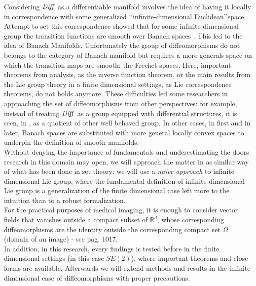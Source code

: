 Considering $\text{\emph{Diff}}$ as a differentiable manifold involves the idea of having it locally in correspondence with some generalized \lq\lq infinite-dimensional Euclidean\rq\rq\phantom{z}space. Attempt to set this correspondence showed that for some infinite-dimensional group the transition functions are smooth over Banach spaces \cite{khesin2008geometry}. This led to the idea of Banach Manifolds. Unfortunately the group of diffeomorphisms do not belongs to the category of Banach manifold but requires a more generals space on which the transition maps are smooth: the Frechet spaces. Here, important theorems from analysis, as the inverse function theorem, or the main results from the Lie group theory in a finite dimensional settings, as Lie correspondence theorems, do not holds anymore. These difficulties led some researchers in approaching the set of diffeomorphisms from other perspectives: 
for example, instead of treating $\text{\emph{Diff}}$ as a group equipped with differential structures, it is seen, in \cite{wojtynski1994one}, as a quotient of other well behaved group. In other cases, in \cite{marsden1970hamiltonian} first and in \cite{milnor1984remarks} later, Banach spaces are substituted with more general locally convex spaces to underpin the definition of smooth manifolds. \\

Without denying the importance of fundamentals and underestimating the doors research in this domain may open, we will approach the matter in as similar way of what has been done in set theory: we will use a \emph{naive approach} to infinite dimensional Lie group, where the fundamental definition of infinite dimensional Lie group is a generalization of the finite dimensional case left more to the intuition than to a robust formalization. \\

For the practical purposes of medical imaging, it is enough to consider vector fields that vanishes outside a compact subset of $\mathbb{R}^d$, whose corresponding diffeomorphisms are the identity outside the corresponding compact set $\Omega$ (domain of an image) - see \cite{Milnor:84:remarks} pag. 1017.\\ 
In addition, in this research, every findings is tested before in the finite dimensional settings (in this case $SE(2)$), where important theorems and close forms are available. Afterwards we will extend methods and results in the infinite dimensional case of diffeomorphisms with proper precautions.\\

